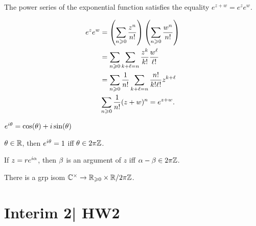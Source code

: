 \documentclass[12pt]{memoir}
\begin{document}
\begin{Lem}
The power series of the exponential function satisfies the equality $e^{z+w}=e^ze^w$. 
\end{Lem}

\begin{ptcbp}
    \begin{align*}
        e^ze^w&=\left(\sum_{n\geqslant 0}\frac{z^n}{n!}\right)\left(\sum_{n\geqslant 0}\frac{w^n}{n!}\right)\\
        &=\sum_{n\geqslant 0}\sum_{k+\ell=n}\frac{z^k}{k!}\frac{w^\ell}{\ell!}\\
        &=\sum_{n\geqslant 0}\frac{1}{n!}\sum_{k+\ell=n}\frac{n!}{k!\ell!}z^{k+\ell}\\
        &\sum_{n\geqslant0}\frac{1}{n!}(z+w)^n=e^{z+w}.
    \end{align*}
\end{ptcbp}

\begin{Th}
    $e^{i\theta}=\cos(\theta)+i\sin(\theta)$
\end{Th}

\begin{Lem}
    $\theta\in\mathbb{R}$, then $e^{i\theta}=1$ iff $\theta\in2\pi\mathbb{Z}$. 
\end{Lem}

\begin{Prop}
If $z=re^{i\alpha}$, then $\beta$ is an argument of $z$ iff $\alpha-\beta\in 2\pi\mathbb{Z}$.
\end{Prop}

\begin{Cor}
    There is a grp isom $\mathbb{C}^\times\to\mathbb{R}_{\geqslant 0}\times\mathbb{R}/2\pi\mathbb{Z}$.
\end{Cor}
\section{Interim 2| HW2}
\end{document}
